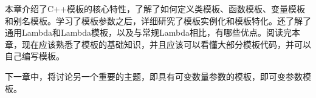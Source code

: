 本章介绍了C++模板的核心特性，了解了如何定义类模板、函数模板、变量模板和别名模板。学习了模板参数之后，详细研究了模板实例化和模板特化。还了解了通用Lambda和Lambda模板，以及与常规Lambda相比，有哪些优点。阅读完本章，现在应该熟悉了模板的基础知识，并且应该可以看懂大部分模板代码，并可以自己编写模板。

下一章中，将讨论另一个重要的主题，即具有可变数量参数的模板，即可变参数模板。